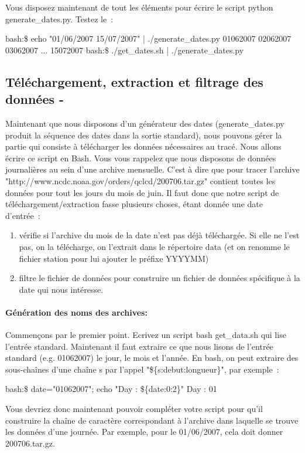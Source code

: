Vous disposez maintenant de tout les éléments pour écrire le script python generate\_dates.py. Testez le~:
\begin{exempleResultat}
bash:\$ echo "01/06/2007 15/07/2007" | ./generate\_dates.py 
01062007
02062007
03062007
...
15072007
bash:\$ ./get\_dates.sh | ./generate\_dates.py 
\end{exempleResultat}

\subsection{Téléchargement, extraction et filtrage des données - \tar \wget \grep \awk \sed}

Maintenant que nous disposons d'un générateur des dates (generate\_dates.py produit la séquence des dates dans la sortie standard), nous pouvons gérer la partie qui consiste à télécharger les données nécessaires au tracé. Nous allons écrire ce script en Bash. Vous vous rappelez que nous disposons de données journalières au sein d'une archive mensuelle. C'est à dire que pour tracer l'archive "http://www.ncdc.noaa.gov/orders/qclcd/200706.tar.gz" contient toutes les données pour tout les jours du mois de juin. Il faut donc que notre script de téléchargement/extraction fasse plusieurs choses, étant donnée une date d'entrée~:
\begin{enumerate}
\item vérifie si l'archive du mois de la date n'est pas déjà téléchargée. Si elle ne l'est pas, on la télécharge, on l'extrait dans le répertoire data (et on renomme le fichier station pour lui ajouter le préfixe YYYYMM)
\item filtre le fichier de données pour construire un fichier de données spécifique à la date qui nous intéresse.
\end{enumerate}


\paragraph{Génération des noms des archives:}
Commençons par le premier point. Ecrivez un script bash get\_data.sh qui lise l'entrée standard. Maintenant il faut extraire ce que nous lisons de l'entrée standard (e.g. 01062007) le jour, le mois et l'année. En bash, on peut extraire des sous-chaînes d'une chaîne s par l'appel "\$\{s:debut:longueur\}", par exemple~:
\begin{exempleResultat}
bash:\$ date="01062007"; echo "Day : \$\{date:0:2\}"
Day : 01
\end{exempleResultat}
Vous devriez donc maintenant pouvoir compléter votre script pour qu'il construire la chaîne de caractère correspondant à l'archive dans laquelle se trouve les données d'une journée. Par exemple, pour le 01/06/2007, cela doit donner 200706.tar.gz.\\

